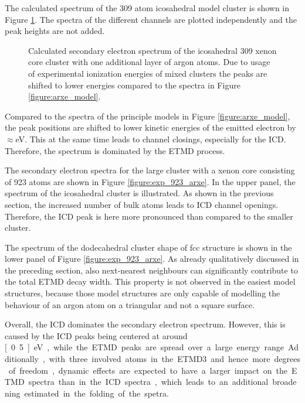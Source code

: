 The calculated spectrum of the 309 atom icosahedral model cluster is
shown in Figure \ref{figure:exp_309ico_arxe}. The spectra of the different
channels are plotted independently and the peak heights are not added.

\begin{figure}[t]
 \centering
 
 \caption{Calculated secondary electron spectrum of the icosahedral
          309 xenon core cluster with one additional layer of argon
          atoms. Due to usage of experimental ionization energies of
          mixed clusters the peaks are shifted to lower energies compared
          to the spectra in Figure \ref{figure:arxe_model}.}
 \label{figure:exp_309ico_arxe}
\end{figure}

Compared to the spectra of the principle models in Figure \ref{figure:arxe_model},
the peak positions are shifted to lower kinetic energies of the emitted
electron by $\approx$\unit[1]{eV}. This at the same time leads to
channel closings, especially for
the \ac{ICD}. Therefore, the spectrum is dominated by the \ac{ETMD} process.


The secondary electron spectra for the large cluster with a xenon
core consisting of 923 atoms are shown in Figure \ref{figure:exp_923_arxe}.
In the upper panel, the spectrum of the icosahedral cluster is illustrated.
As shown in the previous section, the increased number of bulk atoms
leads to ICD channel openings. Therefore, the ICD peak is here more pronounced
than compared to the smaller cluster.

The spectrum of the dodecahedral cluster shape of fcc structure is shown in
the lower panel of Figure \ref{figure:exp_923_arxe}. As already qualitatively
discussed in the preceding section, also next-nearest neighbours can
significantly contribute to the total ETMD decay width. This property is
not observed in the easiest model structures,
because those model structures are only capable of modelling the behaviour of an
argon atom on a triangular and not a square surface.

Overall, the ICD dominates the secondary electron spectrum. However, this
is caused by the ICD peaks being centered at around \unit[0.5]{eV}, while
the ETMD peaks are spread over a large energy range. Additionally, 
with three involved atoms in the ETMD3 and hence more degrees of freedom,
dynamic
effects are expected to have a larger impact on the ETMD spectra
than in the ICD spectra, which leads to an additional
broadening estimated in the folding of the spetra.




